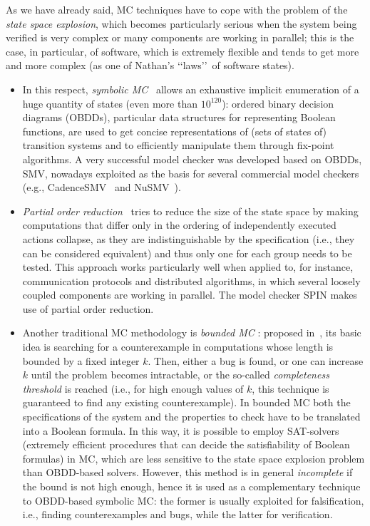 As we have already said, 
MC techniques have to cope with the problem of the \emph{state space explosion},
which becomes particularly serious when the system being verified is very complex or many components are working in parallel; this is the case, in particular, of software, which is extremely flexible and tends to get more and more complex (as one of Nathan's \lq\lq laws\rq\rq\ of software states). 
\begin{itemize}
\item In this respect, \emph{symbolic MC}~\cite{bur90,cou90,mcm93} allows an exhaustive implicit enumeration of a huge quantity of states (even more than $10^{120}$): ordered binary decision diagrams (OBDDs), particular data structures for representing Boolean functions, are used to get concise representations of (sets of states of) transition systems and to efficiently manipulate them through fix-point algorithms. A very successful model checker was developed based on OBDDs, SMV, nowadays exploited as the basis for several commercial model checkers (e.g., CadenceSMV~\cite{cadence} and NuSMV~\cite{Cimatti2000nusmv}).

\item
\emph{Partial order reduction}~\cite{pored93} tries to reduce the size of the state space by making computations that differ only in the ordering of independently executed actions collapse, as they are indistinguishable by the specification (i.e., they can be considered equivalent) and thus only one for each group needs to be tested. This approach works particularly well when applied to, for instance, communication protocols and distributed algorithms, in which several loosely coupled components are working in parallel. The model checker SPIN makes use of partial order reduction.

\item
Another traditional MC methodology is \emph{bounded MC} \cite{biere2003bounded}: proposed in~\cite{biere1999symbolic}, its basic idea is searching for a counterexample in computations whose length is bounded by a fixed integer $k$. Then, either a bug is found, or one can increase $k$ until the problem becomes intractable, or the so-called \emph{completeness threshold} is reached (i.e., for high enough values of $k$, this technique is guaranteed to find any existing counterexample). 
In bounded MC both the specifications of the system and the properties to check have to be translated into a Boolean formula. In this way, it is possible to employ SAT-solvers (extremely efficient procedures that can decide the satisfiability
of Boolean formulas) in MC, which are less sensitive to the state space explosion problem than OBDD-based solvers. However, this method is in general \emph{incomplete} if the bound is not high enough, hence it is used as a complementary technique to OBDD-based symbolic MC: the former is usually exploited for falsification, i.e., finding counterexamples and bugs, while the latter for verification.


\end{itemize}
